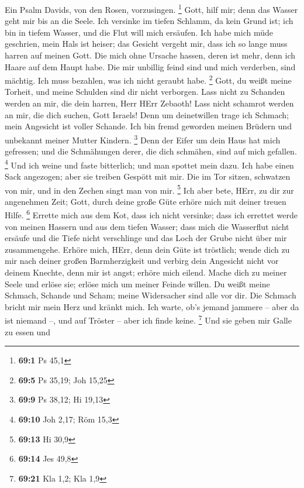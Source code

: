  Ein Psalm Davids, von den Rosen, vorzusingen. \footnote{\textbf{69:1}
  Ps 45,1}  Gott, hilf mir; denn das Wasser geht mir bis
an die Seele.  Ich versinke im tiefen Schlamm, da kein
Grund ist; ich bin in tiefem Wasser, und die Flut will mich ersäufen.
 Ich habe mich müde geschrien, mein Hals ist heiser; das
Gesicht vergeht mir, dass ich so lange muss harren auf meinen Gott.
 Die mich ohne Ursache hassen, deren ist mehr, denn ich
Haare auf dem Haupt habe. Die mir unbillig feind sind und mich
verderben, sind mächtig. Ich muss bezahlen, was ich nicht geraubt habe.
\footnote{\textbf{69:5} Ps 35,19; Joh 15,25}  Gott, du
weißt meine Torheit, und meine Schulden sind dir nicht verborgen.
 Lass nicht zu Schanden werden an mir, die dein harren,
Herr HErr Zebaoth! Lass nicht schamrot werden an mir, die dich suchen,
Gott Israels!  Denn um deinetwillen trage ich Schmach;
mein Angesicht ist voller Schande.  Ich bin fremd geworden
meinen Brüdern und unbekannt meiner Mutter Kindern. \footnote{\textbf{69:9}
  Ps 38,12; Hi 19,13}  Denn der Eifer um dein Haus hat
mich gefressen; und die Schmähungen derer, die dich schmähen, sind auf
mich gefallen. \footnote{\textbf{69:10} Joh 2,17; Röm 15,3}
 Und ich weine und faste bitterlich; und man spottet mein
dazu.  Ich habe einen Sack angezogen; aber sie treiben
Gespött mit mir.  Die im Tor sitzen, schwatzen von mir,
und in den Zechen singt man von mir. \footnote{\textbf{69:13} Hi 30,9}
 Ich aber bete, HErr, zu dir zur angenehmen Zeit; Gott,
durch deine große Güte erhöre mich mit deiner treuen Hilfe. \footnote{\textbf{69:14}
  Jes 49,8}  Errette mich aus dem Kot, dass ich nicht
versinke; dass ich errettet werde von meinen Hassern und aus dem tiefen
Wasser;  dass mich die Wasserflut nicht ersäufe und die
Tiefe nicht verschlinge und das Loch der Grube nicht über mir
zusammengehe.  Erhöre mich, HErr, denn dein Güte ist
tröstlich; wende dich zu mir nach deiner großen Barmherzigkeit
 und verbirg dein Angesicht nicht vor deinem Knechte,
denn mir ist angst; erhöre mich eilend.  Mache dich zu
meiner Seele und erlöse sie; erlöse mich um meiner Feinde willen.
 Du weißt meine Schmach, Schande und Scham; meine
Widersacher sind alle vor dir.  Die Schmach bricht mir
mein Herz und kränkt mich. Ich warte, ob's jemand jammere -- aber da ist
niemand --, und auf Tröster -- aber ich finde keine. \footnote{\textbf{69:21}
  Kla 1,2; Kla 1,9}  Und sie geben mir Galle zu essen und
